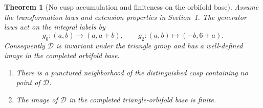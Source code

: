 \documentclass[11pt]{article}
\numberwithin{equation}{section}
\newtheorem{theorem}{Theorem}[section]
\theoremstyle{definition}
\theoremstyle{remark}
\begin{document}
\begin{theorem}[No cusp accumulation and finiteness on the orbifold base]\label{thm:descent-finite}
Assume the transformation laws and extension properties in Section~1.
The generator laws act on the integral labels by
\begin{equation}\label{eq:descent-label-monodromy}
 g_0:(a,b)\longmapsto(a,a+b),
 \qquad
 g_2:(a,b)\longmapsto(-b,6+a).
\end{equation}
Consequently $\mathcal D$ is invariant under the triangle group and has a
well-defined image in the completed orbifold base.

\begin{enumerate}[label=(\roman*),leftmargin=2.3em]
\item There is a punctured neighborhood of the distinguished cusp containing no point of $\mathcal D$.
\item The image of $\mathcal D$ in the completed triangle-orbifold base is finite.
\end{enumerate}
\end{theorem}
\end{document}
